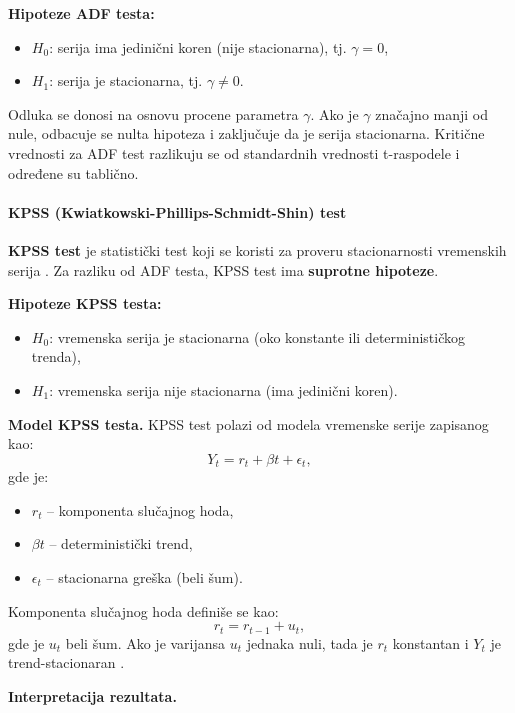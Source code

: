\documentclass[12pt]{article}
\begin{document}
\noindent \textbf{Hipoteze ADF testa:}

\begin{itemize}
\item $H_0$: serija ima jedinični koren (nije stacionarna), tj. $\gamma = 0$,
\item $H_1$: serija je stacionarna, tj. $\gamma \neq 0$.
\end{itemize}

\noindent Odluka se donosi na osnovu procene parametra $\gamma$. Ako je $\gamma$ značajno manji od nule, odbacuje se nulta hipoteza i zaključuje da je serija stacionarna. Kritične vrednosti za ADF test razlikuju se od standardnih vrednosti t-raspodele i određene su tablično.

\paragraph{KPSS (Kwiatkowski-Phillips-Schmidt-Shin) test}

\noindent \textbf{KPSS test} je statistički test koji se koristi za proveru stacionarnosti vremenskih serija \cite{kpss1992}. Za razliku od ADF testa, KPSS test ima \textbf{suprotne hipoteze}.

\bigskip
\noindent \textbf{Hipoteze KPSS testa:}
\begin{itemize}
    \item $H_0$: vremenska serija je stacionarna (oko konstante ili determinističkog trenda),
    \item $H_1$: vremenska serija nije stacionarna (ima jedinični koren).
\end{itemize}

\noindent \textbf{Model KPSS testa.}
KPSS test polazi od modela vremenske serije zapisanog kao:
\[
Y_t = r_t + \beta t + \epsilon_t,
\]
gde je:
\begin{itemize}
    \item $r_t$ – komponenta slučajnog hoda,
    \item $\beta t$ – deterministički trend,
    \item $\epsilon_t$ – stacionarna greška (beli šum).
\end{itemize}

\noindent Komponenta slučajnog hoda definiše se kao:
\[
r_t = r_{t-1} + u_t,
\]
gde je $u_t$ beli šum. Ako je varijansa $u_t$ jednaka nuli, tada je $r_t$ konstantan i $Y_t$ je trend-stacionaran \cite{kpss1992}.

\bigskip

\noindent \textbf{Interpretacija rezultata.}
\end{document}
